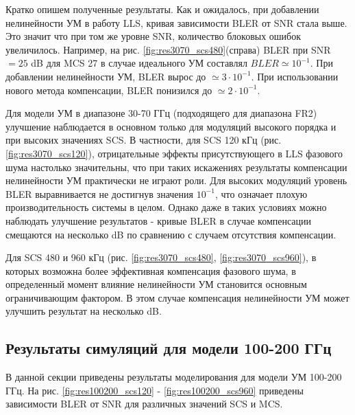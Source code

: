 Кратко опишем полученные результаты. Как и ожидалось, при добавлении
нелинейности УМ в работу LLS, кривая зависимости BLER от SNR стала выше.
Это значит что при том же уровне SNR, количество блоковых ошибок
увеличилось. Например, на рис. \ref{fig:res3070_scs480}(справа)
BLER при SNR$=25$ dB для MCS 27 в случае идеального УМ составлял
$BLER\simeq 10^{-1}$. При добавлении нелинейности УМ, BLER вырос до
$\simeq 3\cdot10^{-1}$. При использовании нового метода компенсации, BLER
понизился до $\simeq 2\cdot10^{-1}$.

Для модели УМ в диапазоне 30-70 ГГц (подходящего для диапазона FR2)
улучшение наблюдается в основном только для модуляций высокого порядка и
при высоких значениях SCS. В частности, для SCS 120 кГц (рис.
\ref{fig:res3070_scs120}), отрицательные эффекты присутствующего в LLS
фазового шума настолько значительны, что при таких искажениях результаты
компенсации нелинейности УМ практически не играют роли. Для высоких
модуляций уровень BLER выравнивается не достигнув значения $10^{-1}$, что
означает плохую производительность системы в целом. Однако даже в таких
условиях можно наблюдать улучшение результатов - кривые BLER в случае
компенсации смещаются на несколько dB по сравнению с случаем отсутствия
компенсации.

Для SCS 480 и 960 кГц (рис. \ref{fig:res3070_scs480},
\ref{fig:res3070_scs960}), в которых возможна более эффективная компенсация
фазового шума, в определенный момент влияние нелинейности УМ становится
основным ограничивающим фактором. В этом случае компенсация нелинейности УМ
может улучшить результат на несколько dB.

\subsection{Результаты симуляций для модели 100-200 ГГц}
В данной секции приведены результаты моделирования для модели УМ 100-200 ГГц. 
На рис. \ref{fig:res100200_scs120} - \ref{fig:res100200_scs960} приведены
зависимости BLER от SNR для различных значений SCS и MCS.

